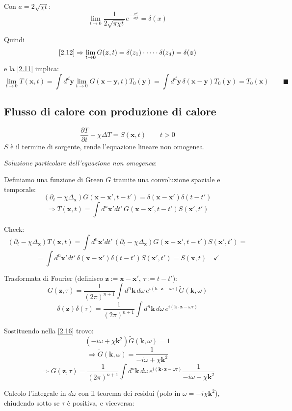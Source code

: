 \documentclass[a4paper,11pt]{report}
\newcommand{\x}{\boldsymbol{x}}
\newcommand{\y}{\boldsymbol{y}}
\newcommand{\kk}{\boldsymbol{k}}
\newcommand{\z}{\boldsymbol{z}}
\begin{document}
Con $a=2\sqrt{\chi t}:$
\begin{equation}
\lim_{t \to 0}\frac{1}{2\sqrt{\pi\chi t}}e^{-\frac{x^2}{4\chi t}}=\delta(x)
\end{equation}

Quindi
\[
\eqref{2.12}\Rightarrow\lim_{t\to 0} G(\z,t)=\delta(z_1)\cdot\dots\cdot\delta(z_d)=\delta(\z)
\]
e la \eqref{2.11} implica:
\[
\lim_{t\to 0}T(\x,t)=\int d^d\y \lim_{t\to 0}G(\x-\y,t)T_0(\y)=\int d^d \y\,\delta(\x-\y)T_0(\y)=T_0(\x) \qquad \blacksquare
\]

\subsection{Flusso di calore con produzione di calore}
\[
\frac{\partial T}{\partial t} -\chi\Delta T=S(\x,t) \qquad t>0
\]
$S$ \`e il termine di sorgente, rende l'equazione lineare non omogenea.

\smallskip

\emph{Soluzione particolare dell'equazione non omogenea}:

Definiamo una funzione di Green $G$ tramite una convoluzione spaziale e temporale:
\begin{equation}
\left(\partial_t-\chi\Delta_{\x}\right)G(\x-\x', t-t')=\delta(\x-\x')\delta(t-t')
\label{2.16}
\end{equation}
\begin{equation}
\Rightarrow T(\x,t)=\int d^n\x'dt'\,G(\x-\x', t-t')S(\x', t')
\label{2.17}
\end{equation}

Check: 
\[
(\partial_t-\chi\Delta_{\x})T(\x,t)=\int d^n\x'dt'\,(\partial_t-\chi\Delta_{\x})G(\x-\x',t-t')S(\x',t')=
\]
\[
=\int d^n\x'dt' \,\delta(\x-\x')\delta(t-t') S(\x',t')=S(\x,t) \quad \checkmark
\]

Trasformata di Fourier (definisco $\z:=\x-\x'$, $\tau := t-t'$):
\[
G(\z,\tau)=\frac{1}{(2\pi)^{n+1}}\int d^n\kk\, d\omega \, e^{i(\kk\cdot \z-\omega\tau)}\tilde{G}(\kk ,\omega)
\]
\[
\delta(\z)\delta(\tau)=\frac{1}{(2\pi)^{n+1}}\int d^n\kk\, d\omega \, e^{i(\kk\cdot \z-\omega\tau)}
\]

Sostituendo nella \eqref{2.16} trovo:
\[
(-i\omega+\chi\kk ^2)\tilde{G}(\kk ,\omega)=1
\]
\[
\Rightarrow\tilde{G}(\kk ,\omega)=\frac{1}{-i\omega+\chi\kk ^2}
\]
\[
\Rightarrow G(\z,\tau)=\frac{1}{(2\pi)^{n+1}}\int d^n\kk\, d\omega \, e^{i(\kk\cdot \z-\omega\tau)}\frac{1}{-i\omega+\chi\kk ^2}
\]

Calcolo l'integrale in $d\omega$ con il teorema dei residui (polo in $\omega=-i\chi \kk^2$), chiudendo sotto se $\tau$ \`e positiva, e viceversa:
\end{document}
